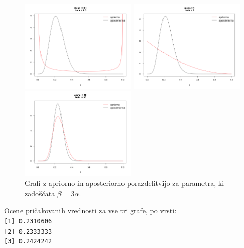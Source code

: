 \documentclass[a4paper,11pt]{article}
\begin{document}
\newpage
\begin{figure}[ht!]
    \begin{minipage}{0.33\textwidth}
        \centering
        \includegraphics[width=55mm]{Slike/2_1.png}
    \end{minipage}\hfill
    \begin{minipage}{0.33\textwidth}
        \centering
        \includegraphics[width=55mm]{Slike/2_4.png}
    \end{minipage}\hfill
    \begin{minipage}{0.33\textwidth}
        \centering
        \includegraphics[width=55mm]{Slike/2_7.png}
    \end{minipage}\hfill
    \caption{Grafi z apriorno in aposteriorno porazdelitvijo za parametra, ki zadoščata  $\beta = 3 \alpha$.}
\end{figure}
\noindent
Ocene pričakovanih vrednosti za vse tri grafe, po vrsti:
\\
\texttt{[1] 0.2310606}
\\
\texttt{[2] 0.2333333}
\\
\texttt{[3] 0.2424242}
\end{document}

